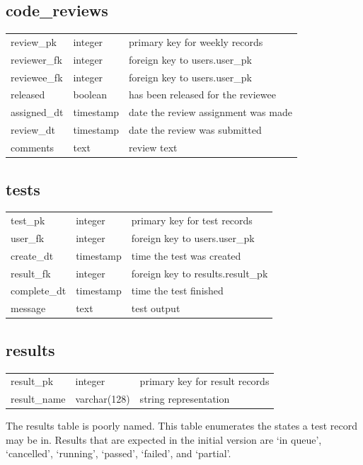 \subsection*{code\_reviews}
\begin{tabular}{l|l|l}
\hline
review\_pk & integer & primary key for weekly records \\
reviewer\_fk & integer & foreign key to users.user\_pk \\
reviewee\_fk & integer & foreign key to users.user\_pk \\
released & boolean & has been released for the reviewee \\
assigned\_dt & timestamp & date the review assignment was made \\
review\_dt & timestamp & date the review was submitted \\
comments & text & review text \\
\hline
\end{tabular}

\subsection*{tests}
\begin{tabular}{l|l|l}
\hline
test\_pk & integer & primary key for test records \\
user\_fk & integer & foreign key to users.user\_pk \\
create\_dt & timestamp & time the test was created \\
result\_fk & integer & foreign key to results.result\_pk \\
complete\_dt & timestamp & time the test finished \\
message & text & test output \\
\hline
\end{tabular}

\subsection*{results}
\begin{tabular}{l|l|l}
\hline
result\_pk & integer & primary key for result records \\
result\_name & varchar(128) & string representation \\
\hline
\end{tabular}

The results table is poorly named. This table enumerates the states a test record may be in. Results that are expected in the initial version are `in queue', `cancelled', `running', `passed', `failed', and `partial'.
